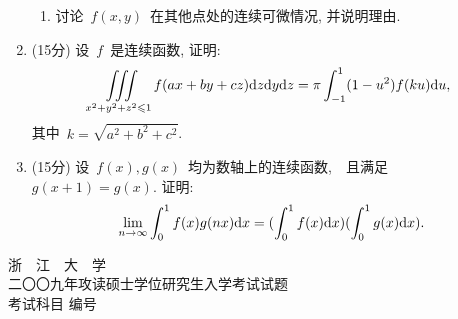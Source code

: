 \documentclass[UTF8,a4paper,11pt]{article}
\begin{document}
\begin{enumerate}
\begin{enumerate}
		      \item 讨论~$f(x,y)$~在其他点处的连续可微情况, 并说明理由.
	      \end{enumerate}
	      \vspace{2em}
	\item (15分) 设~$f$~是连续函数, 证明:
	      \[\iiint\limits_{x^2+y^2+z^2\leqslant 1} f(ax+by+cz)\mathrm{d}z\mathrm{d}y\mathrm{d}z=\pi\int_{-1}^{1}(1-u^2)f(ku)\mathrm{d}u,\]
	      其中~$k=\sqrt{a^2+b^2+c^2}$.
	      \vspace{2em}
	\item (15分) 设~$f(x),g(x)$~均为数轴上的连续函数,　且满足~$g(x+1)=g(x)$. 证明:
	      \[\lim_{n\to\infty}\int_0^1 f(x)g(nx)\mathrm{d}x=(\int_0^1 f(x)\mathrm{d}x)(\int_0^1 g(x)\mathrm{d}x).\]
	      \vspace{2em}
\end{enumerate}

\newpage
\setcounter{page}{1}
\begin{center}
	{\Huge 浙~~江~~大~~学}\\
	\setlength{\parskip}{5pt}
	{\Large 二〇〇九年攻读硕士学位研究生入学考试试题}\\
	\setlength{\parskip}{10 pt}
	{\Large 考试科目\underline{} 编号\underline{}}
\end{center}
\end{document}
